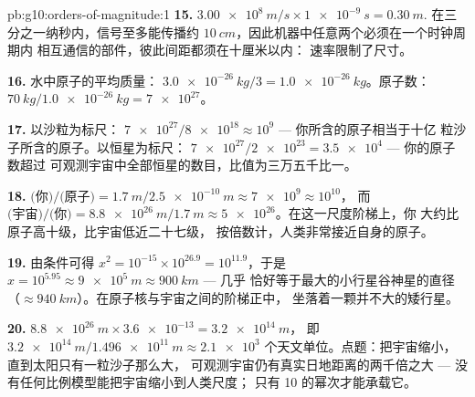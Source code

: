 \begin{solution}{pb:g10:orders-of-magnitude:1}
\textbf{15.} $\qty{3.00e8}{m/s} \times \qty{1e-9}{s} = \qty{0.30}{m}$.
在三分之一纳秒内，信号至多能传播约
$\qty{10}{cm}$，因此机器中任意两个必须在一个时钟周期内
相互通信的部件，彼此间距都须在十厘米以内：
速率限制了尺寸。

\textbf{16.} 水中原子的平均质量：
$\qty{3.0e-26}{kg}/3 = \qty{1.0e-26}{kg}$。原子数：
$\qty{70}{kg}/\qty{1.0e-26}{kg} = \num{7e27}$。

\textbf{17.} 以沙粒为标尺：
$\num{7e27}/\num{8e18} \approx 10^{9}$ --- 你所含的原子相当于十亿
粒沙子所含的原子。以恒星为标尺：
$\num{7e27}/\num{2e23} = \num{3.5e4}$ --- 你的原子数超过
可观测宇宙中全部恒星的数目，比值为三万五千比一。

\textbf{18.} $\text{(你)}/\text{(原子)} =
\qty{1.7}{m}/\qty{2.5e-10}{m} \approx \num{7e9} \approx 10^{10}$，
而 $\text{(宇宙)}/\text{(你)} =
\qty{8.8e26}{m}/\qty{1.7}{m} \approx \num{5e26}$。在这一尺度阶梯上，你
大约比原子高十级，比宇宙低近二十七级，
按倍数计，人类非常接近自身的原子。

\textbf{19.} 由条件可得
$x^{2} = 10^{-15} \times 10^{26.9} = 10^{11.9}$，于是
$x = 10^{5.95} \approx \qty{9e5}{m} \approx \qty{900}{km}$ --- 几乎
恰好等于最大的小行星谷神星的直径
（$\approx \qty{940}{km}$）。在原子核与宇宙之间的阶梯正中，
坐落着一颗并不大的矮行星。

\textbf{20.} $\qty{8.8e26}{m} \times \num{3.6e-13} = \qty{3.2e14}{m}$，
即 $\qty{3.2e14}{m}/\qty{1.496e11}{m} \approx \num{2.1e3}$
个天文单位。点题：把宇宙缩小，直到太阳只有一粒沙子那么大，
可观测宇宙仍有真实日地距离的两千倍之大 ---
没有任何比例模型能把宇宙缩小到人类尺度；
只有 10 的幂次才能承载它。
\end{solution}
